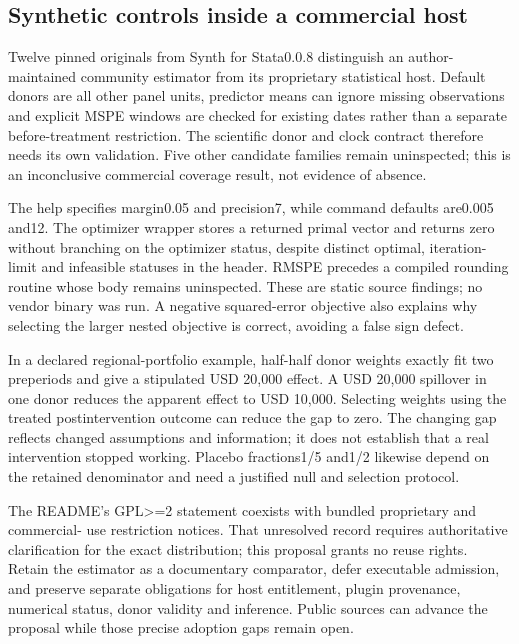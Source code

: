 \hypertarget{synthetic-controls-inside-a-commercial-host}{%
\subsection{Synthetic controls inside a commercial
host}\label{synthetic-controls-inside-a-commercial-host}}

Twelve pinned originals from Synth for Stata0.0.8 distinguish an
author-maintained community estimator from its proprietary statistical
host. Default donors are all other panel units, predictor means can
ignore missing observations and explicit MSPE windows are checked for
existing dates rather than a separate before-treatment restriction. The
scientific donor and clock contract therefore needs its own validation.
Five other candidate families remain uninspected; this is an
inconclusive commercial coverage result, not evidence of absence.
\citep{exec19_synth_stata_source}

The help specifies margin0.05 and precision7, while command defaults
are0.005 and12. The optimizer wrapper stores a returned primal vector
and returns zero without branching on the optimizer status, despite
distinct optimal, iteration- limit and infeasible statuses in the
header. RMSPE precedes a compiled rounding routine whose body remains
uninspected. These are static source findings; no vendor binary was run.
A negative squared-error objective also explains why selecting the
larger nested objective is correct, avoiding a false sign defect.
\citep{exec19_synth_stata_source}

In a declared regional-portfolio example, half-half donor weights
exactly fit two preperiods and give a stipulated USD 20,000 effect. A
USD 20,000 spillover in one donor reduces the apparent effect to USD
10,000. Selecting weights using the treated postintervention outcome can
reduce the gap to zero. The changing gap reflects changed assumptions
and information; it does not establish that a real intervention stopped
working. Placebo fractions1/5 and1/2 likewise depend on the retained
denominator and need a justified null and selection protocol.
\citep{exec19_synth_contract_reference}

The README's GPL\textgreater=2 statement coexists with bundled
proprietary and commercial- use restriction notices. That unresolved
record requires authoritative clarification for the exact distribution;
this proposal grants no reuse rights. Retain the estimator as a
documentary comparator, defer executable admission, and preserve
separate obligations for host entitlement, plugin provenance, numerical
status, donor validity and inference. Public sources can advance the
proposal while those precise adoption gaps remain open.
\citep{exec19_synth_stata_source}

